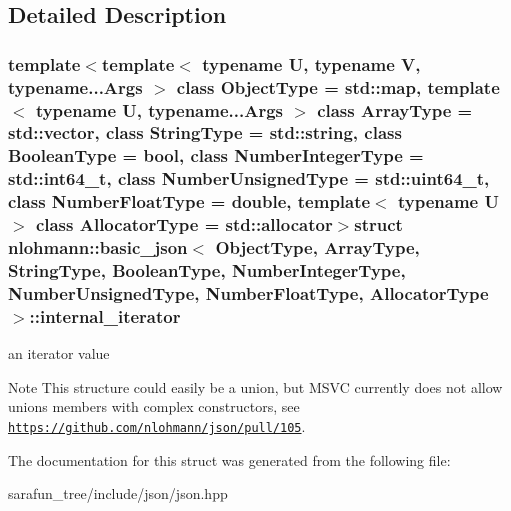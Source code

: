 \subsection{Detailed Description}
\subsubsection*{template$<$template$<$ typename U, typename V, typename...\-Args $>$ class Object\-Type = std\-::map, template$<$ typename U, typename...\-Args $>$ class Array\-Type = std\-::vector, class String\-Type = std\-::string, class Boolean\-Type = bool, class Number\-Integer\-Type = std\-::int64\-\_\-t, class Number\-Unsigned\-Type = std\-::uint64\-\_\-t, class Number\-Float\-Type = double, template$<$ typename U $>$ class Allocator\-Type = std\-::allocator$>$struct nlohmann\-::basic\-\_\-json$<$ Object\-Type, Array\-Type, String\-Type, Boolean\-Type, Number\-Integer\-Type, Number\-Unsigned\-Type, Number\-Float\-Type, Allocator\-Type $>$\-::internal\-\_\-iterator}

an iterator value 

\begin{DoxyNote}{Note}
This structure could easily be a union, but M\-S\-V\-C currently does not allow unions members with complex constructors, see \href{https://github.com/nlohmann/json/pull/105}{\tt https\-://github.\-com/nlohmann/json/pull/105}. 
\end{DoxyNote}


The documentation for this struct was generated from the following file\-:\begin{DoxyCompactItemize}
\item 
sarafun\-\_\-tree/include/json/json.\-hpp\end{DoxyCompactItemize}
